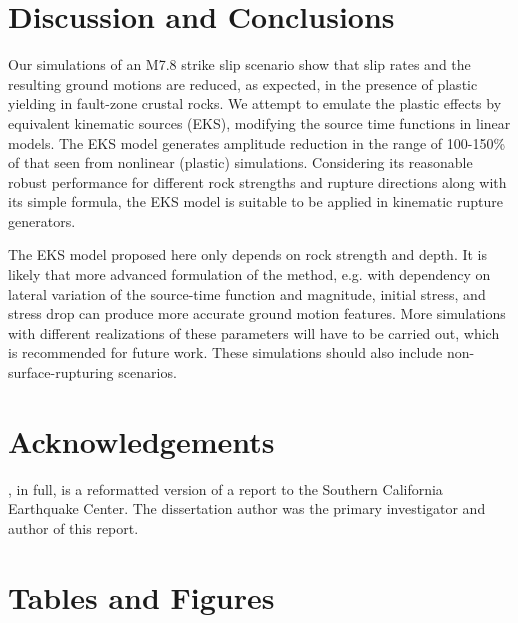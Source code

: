 \section{Discussion and Conclusions}\label{eks:conclusions}
Our simulations of an M7.8 strike slip scenario show that slip rates and the resulting ground motions are reduced, as expected, in the presence of plastic yielding in fault-zone crustal rocks. We attempt to emulate the plastic effects by equivalent kinematic sources (EKS), modifying the source time functions in linear models. The EKS model generates amplitude reduction in the range of 100-150\% of that seen from nonlinear (plastic) simulations.
Considering its reasonable robust performance for different rock strengths and rupture directions along with its simple formula, the EKS model is suitable to be applied in kinematic rupture generators.

The EKS model proposed here only depends on rock strength and depth. It is likely that more advanced formulation of the method, e.g. with dependency on lateral variation of the source-time function and magnitude, initial stress, and stress drop can produce more accurate ground motion features. 
More simulations with different realizations of these parameters will have to be carried out, which is recommended for future work. These simulations should also include non-surface-rupturing scenarios.

\section*{Acknowledgements}

, in full, is a reformatted version of a report to the Southern California Earthquake Center. The dissertation author was the primary investigator and author of this report.


\newpage
\section*{Tables and Figures}
%




